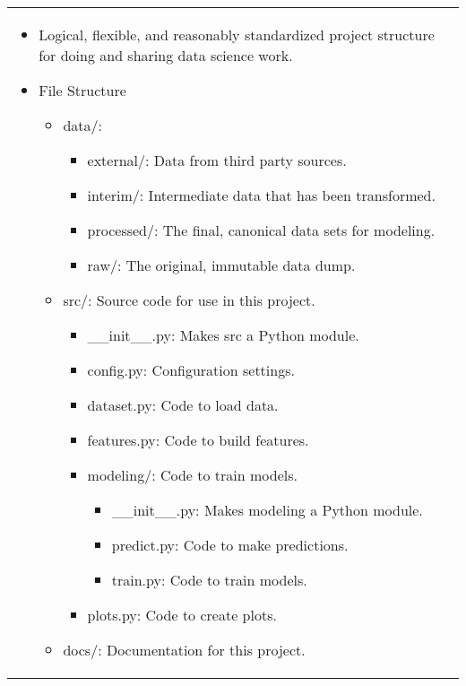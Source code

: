 \begin{summary}
\begin{center}
\begin{tabular}{ll}
            \multicolumn{2}{p{\linewidth}}{
            \begin{itemize}
                \item Logical, flexible, and reasonably standardized project structure for doing and sharing data science work.
                \item File Structure
                \begin{itemize}
                    \item data/: 
                    \begin{itemize}
                        \item external/: Data from third party sources.
                        \item interim/: Intermediate data that has been transformed.
                        \item processed/: The final, canonical data sets for modeling.
                        \item raw/: The original, immutable data dump.
                    \end{itemize}
                    \item src/: Source code for use in this project.
                    \begin{itemize}
                        \item \_\_init\_\_.py: Makes src a Python module.
                        \item config.py: Configuration settings.
                        \item dataset.py: Code to load data.
                        \item features.py: Code to build features.
                        \item modeling/: Code to train models.
                        \begin{itemize}
                            \item \_\_init\_\_.py: Makes modeling a Python module.
                            \item predict.py: Code to make predictions.
                            \item train.py: Code to train models.
                        \end{itemize}
                        \item plots.py: Code to create plots.
                    \end{itemize}
                    \item docs/: Documentation for this project.

\end{itemize}
\end{itemize}}
\end{tabular}
\end{center}
\end{summary}
